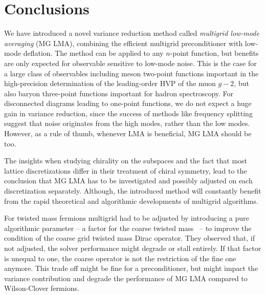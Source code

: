 \chapter{Conclusions}
\label{ch:p2:conclusions}



We have introduced a novel variance reduction method called \emph{multigrid low-mode averaging} (MG LMA), combining the efficient multigrid preconditioner with low-mode deflation.
The method can be applied to any $n$-point function, but benefits are only expected for observable sensitive to low-mode noise.
This is the case for a large class of observables including meson two-point functions important in the high-precision determination of the leading-order HVP of the muon $g-2$, but also baryon three-point functions important for hadron spectroscopy.
For disconnected diagrams leading to one-point functions, we do not expect a huge gain in variance reduction, since the success of methods like frequency splitting suggest that noise originates from the high modes, rather than the low modes.
However, as a rule of thumb, whenever LMA is beneficial, MG LMA should be too.

The insights when studying chirality on the subspaces and the fact that most lattice discretizations differ in their treatment of chiral symmetry, lead to the conclusion that MG LMA has to be investigated and possibly adjusted on each discretization separately.
Although, the introduced method will constantly benefit from the rapid theoretical and algorithmic developments of multigrid algorithms.

For twisted mass fermions multigrid had to be adjusted by introducing a pure algorithmic parameter -- a factor for the coarse twisted mass~\cite{Alexandrou:2016izb} -- to improve the condition of the coarse grid twisted mass Dirac operator.
They observed that, if not adjusted, the solver performance might degrade or stall entirely.
If that factor is unequal to one, the coarse operator is not the restriction of the fine one anymore.
This trade off might be fine for a preconditioner, but might impact the variance contribution and degrade the performance of MG LMA compared to Wilson-Clover fermions.

